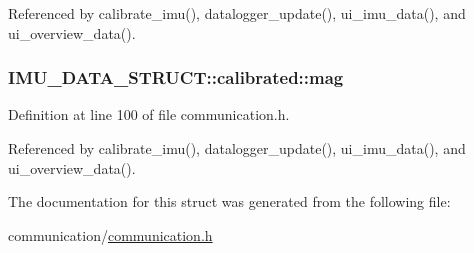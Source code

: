 Referenced by calibrate\-\_\-imu(), datalogger\-\_\-update(), ui\-\_\-imu\-\_\-data(), and ui\-\_\-overview\-\_\-data().

\hypertarget{structIMU__DATA__STRUCT_1_1calibrated_a2fde6c6759e0fda17e272c32096cb9ec}{
\subsubsection[{mag}]{ I\-M\-U\-\_\-\-D\-A\-T\-A\-\_\-\-S\-T\-R\-U\-C\-T\-::calibrated\-::mag}}\label{structIMU__DATA__STRUCT_1_1calibrated_a2fde6c6759e0fda17e272c32096cb9ec}


Definition at line 100 of file communication.\-h.



Referenced by calibrate\-\_\-imu(), datalogger\-\_\-update(), ui\-\_\-imu\-\_\-data(), and ui\-\_\-overview\-\_\-data().



The documentation for this struct was generated from the following file\-:\begin{DoxyCompactItemize}
\item 
communication/\hyperlink{communication_8h}{communication.\-h}\end{DoxyCompactItemize}
